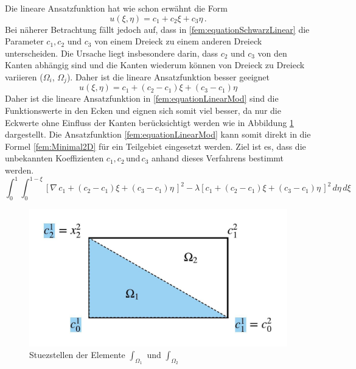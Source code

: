 Die lineare Ansatzfunktion hat wie schon erwähnt die Form
\begin{equation}
u(\xi, \eta) = c_1 + c_2 \xi + c_3 \eta \, .
\label{fem:equationSchwarzLinear}
\end{equation}
Bei näherer Betrachtung fällt jedoch auf, dass in \eqref{fem:equationSchwarzLinear} die Parameter $c_1, c_2$ und $c_3$ von einem Dreieck zu einem anderen Dreieck unterscheiden. Die Ursache liegt insbesondere darin, dass $c_2$ und $c_3$ von den Kanten abhängig sind und die Kanten wiederum können von Dreieck zu Dreieck variieren ($\Omega_i$, $\Omega_j$). Daher ist die lineare Ansatzfunktion besser geeignet
\begin{equation}
u(\xi, \eta) = c_1 + (c_2 - c_1)\xi + (c_3 - c_1)\eta
\label{fem:equationLinearMod}
\end{equation}
Daher ist die lineare Ansatzfunktion in \eqref{fem:equationLinearMod} sind die Funktionswerte in den Ecken und eignen sich somit viel besser, da nur die Eckwerte ohne Einfluss der Kanten berücksichtigt werden wie in Abbildung \ref{fem:Stuestellen} dargestellt. Die Ansatzfunktion \eqref{fem:equationLinearMod} kann somit direkt in die Formel \eqref{fem:Minimal2D} für ein Teilgebiet eingesetzt werden. Ziel ist es, dass die unbekannten Koeffizienten $c_1, c_2 \, $und$ \, c_3$ anhand dieses Verfahrens bestimmt werden.
\begin{equation}
\int_0^1 \int_0^{1 - \xi} [\nabla \, c_1 + (c_2 - c_1)\xi + (c_3 - c_1)\eta \, ]^2 - \lambda[c_1 + (c_2 - c_1)\xi + (c_3 - c_1)\eta \, ]^2 \, d \eta \, d \xi
\label{fem:FlaecheDreieck}
\end{equation}
\begin{figure}[h]
	\centering
	\includegraphics[scale=0.8]{papers/fem/Images/Stuezstellen.jpeg}
	\caption{Stuezstellen der Elemente $\int_{\Omega_1}$ und $\int_{\Omega_2}$ }
	\label{fem:Stuestellen}
\end{figure}
